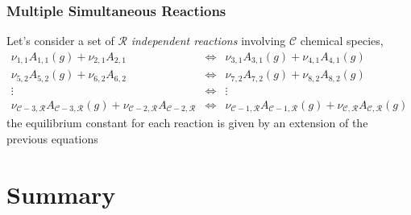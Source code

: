 \documentclass[10pt,compress,unknownkeysallowed]{beamer}
\begin{document}
\begin{frame}
  \frametitle{Multiple Simultaneous Reactions}
      Let's consider a set of $\mathcal{R}$ {\it independent reactions} involving $\mathcal{C}$ chemical species, 
               \begin{eqnarray}
                     \nu_{1,1}A_{1,1} (g) + \nu_{2,1}A_{2,1} &\Longleftrightarrow& \nu_{3,1}A_{3,1} (g) + \nu_{4,1}A_{4,1} (g) \nonumber\\
                     \nu_{5,2}A_{5,2} (g) + \nu_{6,2}A_{6,2} &\Longleftrightarrow& \nu_{7,2}A_{7,2} (g) + \nu_{8,2}A_{8,2} (g)  \nonumber\\
                                 \vdots               &\Longleftrightarrow&     \vdots                         \nonumber\\
                     \nu_{\mathcal{C}-3,\mathcal{R}}A_{\mathcal{C}-3,\mathcal{R}} (g) + \nu_{\mathcal{C}-2,\mathcal{R}}A_{\mathcal{C}-2,\mathcal{R}} &\Longleftrightarrow& \nu_{\mathcal{C}-1,\mathcal{R}}A_{\mathcal{C}-1,\mathcal{R}} (g) + \nu_{\mathcal{C},\mathcal{R}}A_{\mathcal{C},\mathcal{R}} (g) \nonumber
               \end{eqnarray}
      the equilibrium constant for each reaction is given by an extension of the previous equations


\end{frame}
\normalsize

\section{Summary}
\end{document}
